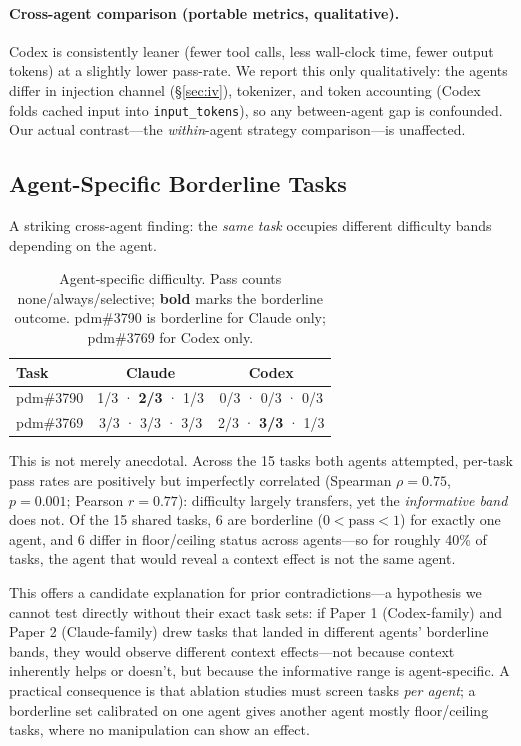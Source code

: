 \documentclass[11pt]{article}
\begin{document}
\paragraph{Cross-agent comparison (portable metrics, qualitative).}
Codex is consistently leaner (fewer tool calls, less wall-clock time, fewer output tokens) at a slightly lower pass-rate.
We report this only qualitatively: the agents differ in injection channel (\S\ref{sec:iv}), tokenizer, and token accounting (Codex folds cached input into \texttt{input\_tokens}), so any between-agent gap is confounded. Our actual contrast---the \emph{within}-agent strategy comparison---is unaffected.

\subsection{Agent-Specific Borderline Tasks}
\label{sec:borderline}

A striking cross-agent finding: the \emph{same task} occupies different difficulty bands depending on the agent.

\begin{table}[t]
\centering
\small
\setlength{\tabcolsep}{5pt}
\caption{Agent-specific difficulty. Pass counts none/always/selective; \textbf{bold} marks the borderline outcome. pdm\#3790 is borderline for Claude only; pdm\#3769 for Codex only.}
\label{tab:borderline}
\begin{tabular}{@{}lcc@{}}
\toprule
\textbf{Task} & \textbf{Claude} & \textbf{Codex} \\
\midrule
pdm\#3790 & 1/3 · \textbf{2/3} · 1/3 & 0/3 · 0/3 · 0/3 \\
pdm\#3769 & 3/3 · 3/3 · 3/3 & 2/3 · \textbf{3/3} · 1/3 \\
\bottomrule
\end{tabular}
\end{table}

This is not merely anecdotal. Across the 15 tasks both agents attempted, per-task pass rates are positively but imperfectly correlated (Spearman $\rho{=}0.75$, $p{=}0.001$; Pearson $r{=}0.77$): difficulty largely transfers, yet the \emph{informative band} does not.
Of the 15 shared tasks, 6 are borderline ($0{<}\text{pass}{<}1$) for exactly one agent, and 6 differ in floor/ceiling status across agents---so for roughly 40\% of tasks, the agent that would reveal a context effect is not the same agent.

This offers a candidate explanation for prior contradictions---a hypothesis we cannot test directly without their exact task sets: if Paper 1 (Codex-family) and Paper 2 (Claude-family) drew tasks that landed in different agents' borderline bands, they would observe different context effects---not because context inherently helps or doesn't, but because the informative range is agent-specific.
A practical consequence is that ablation studies must screen tasks \emph{per agent}; a borderline set calibrated on one agent gives another agent mostly floor/ceiling tasks, where no manipulation can show an effect.
\end{document}
